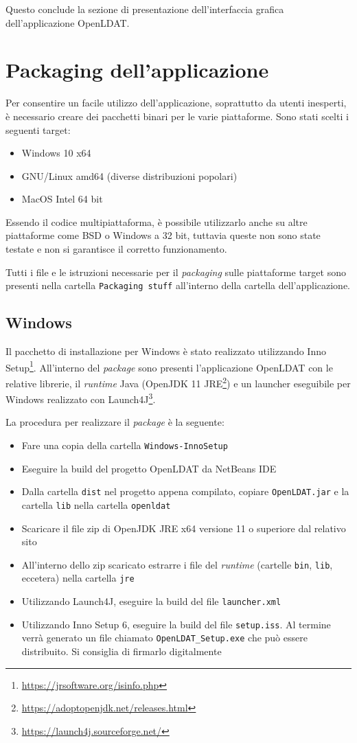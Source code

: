 Questo conclude la sezione di presentazione dell'interfaccia grafica dell'applicazione OpenLDAT.

\section{Packaging dell'applicazione}
Per consentire un facile utilizzo dell'applicazione, soprattutto da utenti inesperti, è necessario creare dei pacchetti binari per le varie piattaforme. Sono stati scelti i seguenti target:\begin{itemize}
	\item Windows 10 x64
	\item GNU/Linux amd64 (diverse distribuzioni popolari)
	\item MacOS Intel 64 bit
\end{itemize}
Essendo il codice multipiattaforma, è possibile utilizzarlo anche su altre piattaforme come BSD o Windows a 32 bit, tuttavia queste non sono state testate e non si garantisce il corretto funzionamento.

Tutti i file e le istruzioni necessarie per il \textit{packaging} sulle piattaforme target sono presenti nella cartella \texttt{Packaging stuff} all'interno della cartella dell'applicazione.

\subsection{Windows}
Il pacchetto di installazione per Windows è stato realizzato utilizzando Inno Setup\footnote{\url{https://jrsoftware.org/isinfo.php}}. All'interno del \textit{package} sono presenti l'applicazione OpenLDAT con le relative librerie, il \textit{runtime} Java (OpenJDK 11 JRE\footnote{\url{https://adoptopenjdk.net/releases.html}}) e un launcher eseguibile per Windows realizzato con Launch4J\footnote{\url{https://launch4j.sourceforge.net/}}.

La procedura per realizzare il \textit{package} è la seguente:\begin{itemize}
	\item Fare una copia della cartella \texttt{Windows-InnoSetup}
	\item Eseguire la build del progetto OpenLDAT da NetBeans IDE
	\item Dalla cartella \texttt{dist} nel progetto appena compilato, copiare \texttt{OpenLDAT.jar} e la cartella \texttt{lib} nella cartella \texttt{openldat}
	\item Scaricare il file zip di OpenJDK JRE x64 versione 11 o superiore dal relativo sito
	\item All'interno dello zip scaricato estrarre i file del \textit{runtime} (cartelle \texttt{bin}, \texttt{lib}, eccetera) nella cartella \texttt{jre}
	\item Utilizzando Launch4J, eseguire la build del file \texttt{launcher.xml}
	\item Utilizzando Inno Setup 6, eseguire la build del file \texttt{setup.iss}. Al termine verrà generato un file chiamato \texttt{OpenLDAT\_Setup.exe} che può essere distribuito. Si consiglia di firmarlo digitalmente
\end{itemize}

